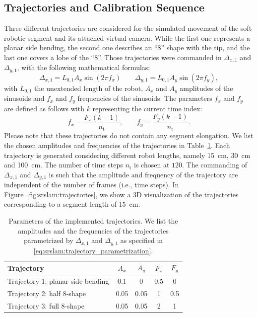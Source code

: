 \subsection{Trajectories and Calibration Sequence}\label{sub:srslam:trajectories}
Three different trajectories are considered for the simulated movement of the soft robotic segment and its attached virtual camera. While the first one represents a planar side bending, the second one describes an “8” shape with the tip, and the last one covers a lobe of the “8”. 
Those trajectories were commanded in $\Delta_{x,1}$ and $\Delta_{y,1}$, with the following mathematical formulas:
\begin{equation}\label{eq:srslam:trajectory_parametrization}
    \Delta_{x,1} = L_{0,1} A_x \sin(2 \pi f_x) \qquad \Delta_{y,1} = L_{0,1} A_y \sin(2 \pi f_y),
\end{equation}
with $L_{0,1}$ the unextended length of the robot, $A_x$ and $A_y$ amplitudes of the sinusoids and $f_x$ and $f_y$ frequencies of the sinusoids.
The parameters $f_x$ and $f_y$ are defined as follows with $k$ representing the current time index:
\begin{equation}
    f_x = \frac{F_x (k-1)}{n_{\mathrm{t}}}, \qquad f_y = \frac{F_y (k-1)}{n_{\mathrm{t}}}.
\end{equation}
Please note that these trajectories do not contain any segment elongation. 
We list the chosen amplitudes and frequencies of the trajectories in Table~\ref{tab:srslam:trajectory_params}. Each trajectory is generated considering different robot lengths, namely \SI{15}{cm}, \SI{30}{cm} and \SI{100}{cm}. The number of time steps $n_{\mathrm{t}}$ is chosen at $120$. 
The commanding of $\Delta_{x,1}$ and $\Delta_{y,1}$ is such that the amplitude and frequency of the trajectory are independent of the number of frames (i.e., time steps).
In Figure~\ref{fig:srslam:trajectories}, we show a 3D visualization of the trajectories corresponding to a segment length of \SI{15}{cm}.

\begin{table}
\centering
\caption{Parameters of the implemented trajectories. We list the amplitudes and the frequencies of the trajectories parametrized by $\Delta_{x,1}$ and $\Delta_{y,1}$ as specified in \eqref{eq:srslam:trajectory_parametrization}.}
\begin{tabular}{lcccc}\toprule
\textbf{Trajectory} & $A_x$ & $A_y$ & $F_x$ & $F_y$\\
\midrule
Trajectory 1: planar side bending & 0.1 & 0 & 0.5 & 0\\
Trajectory 2: half 8-shape & 0.05 & 0.05 & 1 & 0.5\\
Trajectory 3: full 8-shape & 0.05 & 0.05 & 2 & 1\\
\bottomrule
\end{tabular}
\label{tab:srslam:trajectory_params}
\end{table}

